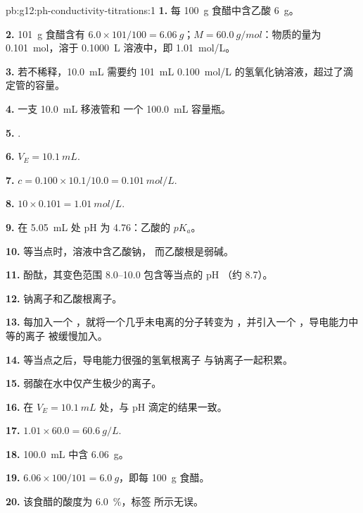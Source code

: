 \begin{solution}{pb:g12:ph-conductivity-titrations:1}
\textbf{1.} 每 \qty{100}{g} 食醋中含乙酸 \qty{6}{g}。

\textbf{2.} \qty{101}{g} 食醋含有 $6.0 \times 101/100 =
\qty{6.06}{g}$；$M = \qty{60.0}{g/mol}$：物质的量为 \qty{0.101}{mol}，溶于
\qty{0.1000}{L} 溶液中，即 \qty{1.01}{mol/L}。

\textbf{3.} 若不稀释，\qty{10.0}{mL} 需要约 \qty{101}{mL}
\qty{0.100}{mol/L} 的氢氧化钠溶液，超过了滴定管的容量。

\textbf{4.} 一支 \qty{10.0}{mL} 移液管和
一个 \qty{100.0}{mL} 容量瓶。

\textbf{5.} .

\textbf{6.} $V_E = \qty{10.1}{mL}$.

\textbf{7.} $c = 0.100 \times 10.1 / 10.0 = \qty{0.101}{mol/L}$.

\textbf{8.} $10 \times 0.101 = \qty{1.01}{mol/L}$.

\textbf{9.} 在 \qty{5.05}{mL} 处 pH 为 4.76：乙酸的 $pK_a$。

\textbf{10.} 等当点时，溶液中含乙酸钠，
而乙酸根是弱碱。

\textbf{11.} 酚酞，其变色范围 8.0--10.0 包含等当点的 pH
（约 8.7）。

\textbf{12.} 钠离子和乙酸根离子。

\textbf{13.} 每加入一个 ，就将一个几乎未电离的分子转变为
，并引入一个 ，导电能力中等的离子
被缓慢加入。

\textbf{14.} 等当点之后，导电能力很强的氢氧根离子
与钠离子一起积累。

\textbf{15.} 弱酸在水中仅产生极少的离子。

\textbf{16.} 在 $V_E = \qty{10.1}{mL}$ 处，与 pH 滴定的结果一致。

\textbf{17.} $1.01 \times 60.0 = \qty{60.6}{g/L}$.

\textbf{18.} \qty{100.0}{mL} 中含 \qty{6.06}{g}。

\textbf{19.} $6.06 \times 100 / 101 = \qty{6.0}{g}$，即每 \qty{100}{g} 食醋。

\textbf{20.} 该食醋的酸度为 \qty{6.0}{\percent}，标签
所示无误。
\end{solution}
